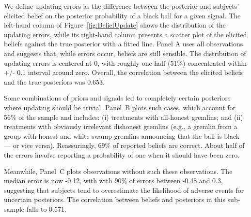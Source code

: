 \documentclass[12pt,a4paper]{article}
\begin{document}
\begin{figure}[H]
	\hfill
	\hfill
\end{figure}

We define updating errors as the difference between the posterior and subjects' elicited belief on the posterior probability of a black ball for a given signal.  The left-hand column of Figure~\ref{fig:BeliefUpdate} shows the distribution of the updating errors, while its right-hand column presents a scatter plot of the elicited beliefs against the true posterior with a fitted line.
Panel A uses all observations and suggests that, while errors occur, beliefs are still sensible. The distribution of updating errors is centered at 0, with roughly one-half (51\%) concentrated within +/- 0.1 interval around zero. Overall, the correlation between the elicited beliefs and the true posteriors was 0.653.  

Some combinations of priors and signals led to completely certain posteriors where updating should be trivial.  
Panel~B plots such cases, which account for 56\% of the sample and includes: (i) treatments with all-honest gremlins; and (ii) treatments with obviously irrelevant dishonest gremlins (e.g., a gremlin from a group with honest and white-swamp gremlins announcing that the ball is black --- or vice versa). Reassuringly, 69\% of reported beliefs are correct. About half of the errors involve reporting a probability of one when it should have been zero.

Meanwhile, Panel~C plots observations without such these observations. The median error is now -0.12, with with 90\% of errors between -0.48 and 0.3, suggesting that subjects tend to overestimate the likelihood of adverse events for uncertain posteriors. The correlation between beliefs and posteriors in this sub-sample falls to 0.571.  
\end{document}
